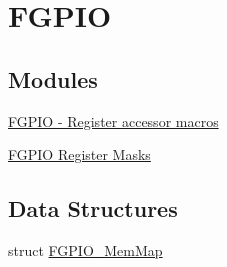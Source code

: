 \hypertarget{group___f_g_p_i_o___peripheral}{}\section{F\+G\+P\+I\+O}
\label{group___f_g_p_i_o___peripheral}
\subsection*{Modules}
\begin{DoxyCompactItemize}
\item 
\hyperlink{group___f_g_p_i_o___register___accessor___macros}{F\+G\+P\+I\+O -\/ Register accessor macros}
\item 
\hyperlink{group___f_g_p_i_o___register___masks}{F\+G\+P\+I\+O Register Masks}
\end{DoxyCompactItemize}
\subsection*{Data Structures}
\begin{DoxyCompactItemize}
\item 
struct \hyperlink{struct_f_g_p_i_o___mem_map}{F\+G\+P\+I\+O\+\_\+\+Mem\+Map}
\end{DoxyCompactItemize}
